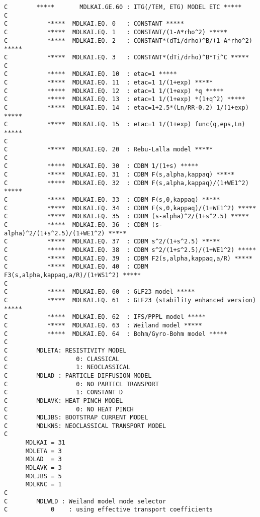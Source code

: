 \documentclass[11pt]{jarticle}
\begin{document}
\begin{verbatim}
C        *****       MDLKAI.GE.60 : ITG(/TEM, ETG) MODEL ETC *****
C
C           *****  MDLKAI.EQ. 0   : CONSTANT *****
C           *****  MDLKAI.EQ. 1   : CONSTANT/(1-A*rho^2) *****
C           *****  MDLKAI.EQ. 2   : CONSTANT*(dTi/drho)^B/(1-A*rho^2) *****
C           *****  MDLKAI.EQ. 3   : CONSTANT*(dTi/drho)^B*Ti^C *****
C                                                                  
C           *****  MDLKAI.EQ. 10  : etac=1 *****
C           *****  MDLKAI.EQ. 11  : etac=1 1/(1+exp) *****
C           *****  MDLKAI.EQ. 12  : etac=1 1/(1+exp) *q *****
C           *****  MDLKAI.EQ. 13  : etac=1 1/(1+exp) *(1+q^2) *****
C           *****  MDLKAI.EQ. 14  : etac=1+2.5*(Ln/RR-0.2) 1/(1+exp) *****
C           *****  MDLKAI.EQ. 15  : etac=1 1/(1+exp) func(q,eps,Ln) *****
C                                                                  
C           *****  MDLKAI.EQ. 20  : Rebu-Lalla model *****
C                                                                  
C           *****  MDLKAI.EQ. 30  : CDBM 1/(1+s) *****
C           *****  MDLKAI.EQ. 31  : CDBM F(s,alpha,kappaq) *****
C           *****  MDLKAI.EQ. 32  : CDBM F(s,alpha,kappaq)/(1+WE1^2) *****
C           *****  MDLKAI.EQ. 33  : CDBM F(s,0,kappaq) *****
C           *****  MDLKAI.EQ. 34  : CDBM F(s,0,kappaq)/(1+WE1^2) *****
C           *****  MDLKAI.EQ. 35  : CDBM (s-alpha)^2/(1+s^2.5) *****
C           *****  MDLKAI.EQ. 36  : CDBM (s-alpha)^2/(1+s^2.5)/(1+WE1^2) *****
C           *****  MDLKAI.EQ. 37  : CDBM s^2/(1+s^2.5) *****
C           *****  MDLKAI.EQ. 38  : CDBM s^2/(1+s^2.5)/(1+WE1^2) *****
C           *****  MDLKAI.EQ. 39  : CDBM F2(s,alpha,kappaq,a/R) *****
C           *****  MDLKAI.EQ. 40  : CDBM F3(s,alpha,kappaq,a/R)/(1+WS1^2) *****
C
C           *****  MDLKAI.EQ. 60  : GLF23 model *****
C           *****  MDLKAI.EQ. 61  : GLF23 (stability enhanced version) *****
C           *****  MDLKAI.EQ. 62  : IFS/PPPL model *****
C           *****  MDLKAI.EQ. 63  : Weiland model *****
C           *****  MDLKAI.EQ. 64  : Bohm/Gyro-Bohm model *****
C
C        MDLETA: RESISTIVITY MODEL
C                   0: CLASSICAL 
C                   1: NEOCLASSICAL
C        MDLAD : PARTICLE DIFFUSION MODEL
C                   0: NO PARTICL TRANSPORT 
C                   1: CONSTANT D
C        MDLAVK: HEAT PINCH MODEL
C                   0: NO HEAT PINCH
C        MDLJBS: BOOTSTRAP CURRENT MODEL
C        MDLKNS: NEOCLASSICAL TRANSPORT MODEL
C
      MDLKAI = 31
      MDLETA = 3
      MDLAD  = 3
      MDLAVK = 3
      MDLJBS = 5
      MDLKNC = 1
C
C        MDLWLD : Weiland model mode selector
C            0    : using effective transport coefficients

\end{verbatim}
\end{document}

